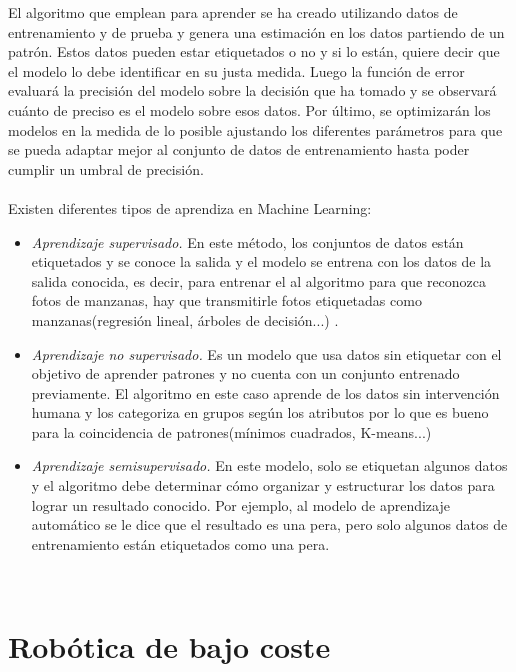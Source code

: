 El algoritmo que emplean para aprender se ha creado utilizando datos de entrenamiento y de prueba y genera una estimación en los datos partiendo de un patrón. Estos datos pueden estar etiquetados o no y si lo están, quiere decir que el modelo lo debe identificar en su justa medida. Luego la función de error evaluará la precisión del modelo sobre la decisión que ha tomado y se observará cuánto de preciso es el modelo sobre esos datos. Por último, se optimizarán los modelos en la medida de lo posible ajustando los diferentes parámetros para que se pueda adaptar mejor al conjunto de datos de entrenamiento hasta poder cumplir un umbral de precisión.\\ \\



Existen diferentes tipos de aprendiza en Machine Learning: 

\begin{itemize}
 \item \textit{Aprendizaje supervisado.} En este método, los conjuntos de datos están etiquetados y se conoce la salida y el modelo se entrena con los datos de la salida conocida, es decir, para entrenar el al algoritmo para que reconozca fotos de manzanas, hay que transmitirle fotos etiquetadas como manzanas(regresión lineal, árboles de decisión...) .
 \item \textit{Aprendizaje no supervisado.} Es un modelo que usa datos sin etiquetar con el objetivo de aprender patrones y no cuenta con un conjunto entrenado previamente. El algoritmo en este caso aprende de los datos sin intervención humana y los categoriza en grupos según los atributos por lo que es bueno para la coincidencia de patrones(mínimos cuadrados, K-means...)
 \item \textit{Aprendizaje semisupervisado.} En este modelo, solo se etiquetan algunos datos y el algoritmo debe determinar cómo organizar y estructurar los datos para lograr un resultado conocido. Por ejemplo, al modelo de aprendizaje automático se le dice que el resultado es una pera, pero solo algunos datos de entrenamiento están etiquetados como una pera.
\end{itemize}\


 
\label{sec:cuartaseccion}


\section{Robótica de bajo coste}
\label{sec:quintaseccion}

